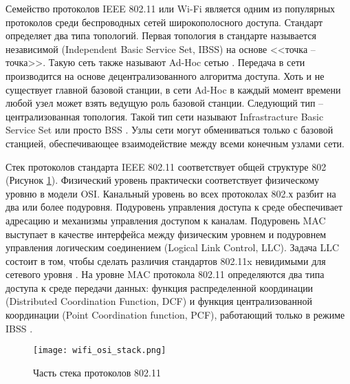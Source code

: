 Семейство протоколов IEEE 802.11 или Wi-Fi является одним из популярных протоколов среди беспроводных сетей широкополосного доступа. Стандарт определяет два типа топологий. Первая топология в стандарте называется независимой (Independent Basic Service Set, IBSS) на основе <<точка -- точка>>. Такую сеть также называют Ad-Hoc сетью \cite{SmelyanskyBook}. Передача в сети производится на основе децентрализованного алгоритма доступа. Хоть и не существует главной базовой станции, в сети Ad-Hoc в каждый момент времени любой узел может взять ведущую роль базовой станции. Следующий тип -- централизованная топология. Такой тип сети называют Infrastracture  Basic Service Set или просто BSS \cite{Olifer2020}. Узлы сети могут обмениваться только с базовой станцией, обеспечивающее взаимодействие между всеми конечным узлами сети. 
 
Стек протоколов стандарта IEEE 802.11 соответствует общей структуре 802 (Рисунок \cref{fig:part1_wifi_osi_stack}). Физический уровень практически соответствует физическому уровню в модели OSI. Канальный уровень во всех протоколах 802.х разбит на два или более подуровня.  Подуровень управления доступа к среде обеспечивает адресацию и механизмы управления доступом к каналам. Подуровень MAC выступает в качестве интерфейса между физическим уровнем и подуровнем управления логическим соединением (Logical Link Control, LLC). Задача LLC состоит в том, чтобы сделать различия стандартов 802.11x невидимыми для сетевого уровня \cite{Tanenbaum2022}. На уровне MAC протокола 802.11 определяются два типа доступа к среде передачи данных: функция распределенной координации (Distributed Coordination Function, DCF) и функция централизованной координации (Point Coordination function, PCF), работающий только в режиме IBSS \cite{802.11WG-WirelessLANWorkingGroup2020}.


\begin{figure}[h!]
  \centering
   \texttt{[image: wifi\_osi\_stack.png]}
\caption{Часть стека протоколов 802.11}
\label{fig:part1_wifi_osi_stack}
\end{figure}

